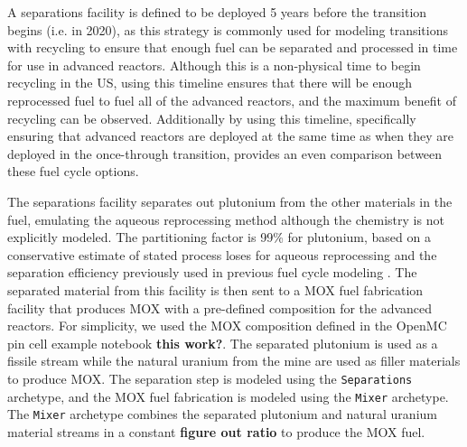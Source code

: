 

A separations facility is defined to be deployed 5 
years before the transition 
begins (i.e. in 2020), as this strategy is commonly used for modeling 
transitions with recycling \cite{passerini_systematic_2014,richards_application_2021}
to ensure that enough fuel can be separated and 
processed in time for use in advanced reactors. Although this is a 
non-physical time to begin recycling in the US, using this timeline ensures 
that there will be enough reprocessed fuel to fuel all of the advanced 
reactors, and the maximum benefit of recycling can be observed. Additionally 
by using this timeline, specifically ensuring that advanced reactors 
are deployed at the same time as when they are deployed in the once-through 
transition, provides an even comparison between these fuel cycle options.

The separations facility separates out plutonium from the other 
materials in the fuel, emulating the aqueous reprocessing method although the 
chemistry is not explicitly modeled. The partitioning factor is 99\% for
plutonium, based on a conservative estimate of stated 
process loses for aqueous reprocessing \cite{herbst_6_2011} and the 
separation efficiency previously used in previous fuel cycle modeling 
\cite{wigeland_nuclear_2014,sunny_transition_2015}. The separated 
material from this facility is then sent to a \gls{MOX} fuel fabrication 
facility that produces \gls{MOX} with a pre-defined composition for the 
advanced reactors. For simplicity, we used the \gls{MOX} composition 
defined in the OpenMC pin cell example notebook \textbf{this work?}.
The separated plutonium is used as a fissile stream while the 
natural uranium from the mine are used as filler materials to 
produce \gls{MOX}. The separation step is modeled using the \Cycamore 
\texttt{Separations} archetype, and the \gls{MOX} fuel fabrication is modeled 
using the \Cycamore \texttt{Mixer} archetype. The \texttt{Mixer} archetype 
combines the 
separated plutonium and natural uranium material streams in a constant 
\textbf{figure out ratio} to produce the \gls{MOX} fuel. 

